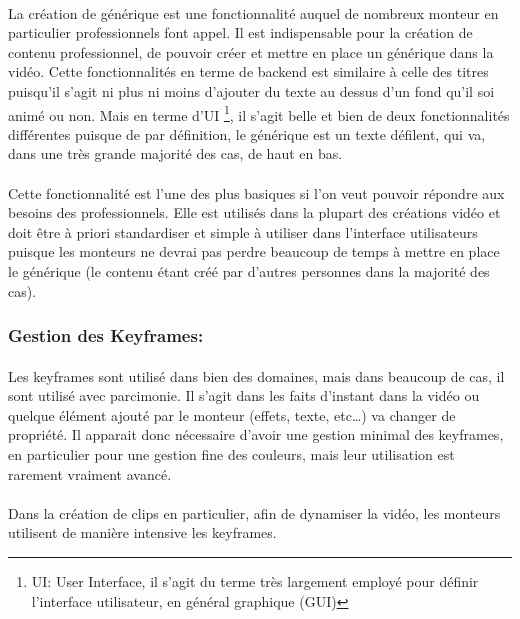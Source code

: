 \paragraph{}
La création de générique est une fonctionnalité auquel de
nombreux monteur en particulier professionnels font appel. Il est
indispensable  pour la création de contenu professionnel, de pouvoir
créer et mettre en place un générique dans la vidéo. Cette
fonctionnalités en terme de backend est similaire à
celle des titres puisqu'il s'agit ni plus ni moins d'ajouter du
texte au dessus d'un fond qu'il soi animé ou non. Mais en terme d'UI
\footnote{UI: User Interface, il s'agit du terme  très largement
employé pour définir l'interface utilisateur, en général graphique (GUI)},
il s'agit belle et bien de deux fonctionnalités différentes puisque de par
définition, le générique est un texte défilent, qui va, dans une très grande
majorité des cas, de haut en bas.

\paragraph{}
Cette fonctionnalité est l'une des plus basiques si
l'on veut pouvoir répondre aux besoins des professionnels. Elle est utilisés
dans la plupart des créations vidéo et doit être à priori standardiser et
simple à utiliser dans l'interface utilisateurs puisque les monteurs ne devrai
pas perdre beaucoup de temps à mettre en place le générique (le contenu étant
créé par d'autres personnes dans la majorité des cas).

\subsubsection{Gestion des Keyframes:}
\paragraph{}
Les keyframes sont utilisé dans bien des domaines, mais dans beaucoup de cas, il sont
utilisé avec parcimonie. Il s'agit dans les faits d'instant dans la vidéo ou quelque
élément ajouté par le monteur (effets, texte, etc\ldots) va changer de propriété. Il
apparait donc nécessaire d'avoir une gestion minimal des keyframes,
en particulier pour une gestion fine des couleurs, mais leur utilisation est
rarement vraiment avancé.

\paragraph{}
Dans la création de clips en particulier, afin de dynamiser la vidéo,
les monteurs utilisent de manière intensive les keyframes.


